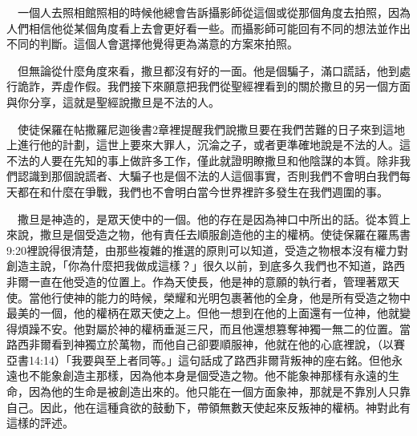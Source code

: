 \documentclass{book}
\begin{document}
\begin{center}
\noindent{}
\end{center}

　一個人去照相館照相的時候他總會告訴攝影師從這個或從那個角度去拍照，因為人們相信他從某個角度看上去會更好看一些。而攝影師可能回有不同的想法並作出不同的判斷。這個人會選擇他覺得更為滿意的方案來拍照。

　但無論從什麼角度來看，撒旦都沒有好的一面。他是個騙子，滿口謊話，他到處行詭詐，弄虛作假。我們接下來願意把我們從聖經裡看到的關於撒旦的另一個方面與你分享，這就是聖經說撒旦是不法的人。

　使徒保羅在帖撒羅尼迦後書2章裡提醒我們說撒旦要在我們苦難的日子來到這地上進行他的計劃，這世上要來大罪人，沉淪之子，或者更準確地說是不法的人。這不法的人要在先知的事上做許多工作，僅此就證明瞭撒旦和他陰謀的本質。除非我們認識到那個說謊者、大騙子也是個不法的人這個事實，否則我們不會明白我們每天都在和什麼在爭戰，我們也不會明白當今世界裡許多發生在我們週圍的事。

　撒旦是神造的，是眾天使中的一個。他的存在是因為神口中所出的話。從本質上來說，撒旦是個受造之物，他有責任去順服創造他的主的權柄。使徒保羅在羅馬書9:20裡說得很清楚，由那些複雜的推選的原則可以知道，受造之物根本沒有權力對創造主說，「你為什麼把我做成這樣？」很久以前，到底多久我們也不知道，路西非爾一直在他受造的位置上。作為天使長，他是神的意願的執行者，管理著眾天使。當他行使神的能力的時候，榮耀和光明包裹著他的全身，他是所有受造之物中最美的一個，他的權柄在眾天使之上。但他一想到在他的上面還有一位神，他就變得煩躁不安。他對屬於神的權柄垂涎三尺，而且他還想篡奪神獨一無二的位置。當路西非爾看到神獨立於萬物，而他自己卻要順服神，他就在他的心底裡說，（以賽亞書14:14）「我要與至上者同等。」這句話成了路西非爾背叛神的座右銘。但他永遠也不能象創造主那樣，因為他本身是個受造之物。他不能象神那樣有永遠的生命，因為他的生命是被創造出來的。他只能在一個方面象神，那就是不靠別人只靠自己。因此，他在這種貪欲的鼓動下，帶領無數天使起來反叛神的權柄。神對此有這樣的評述。
\end{document}
